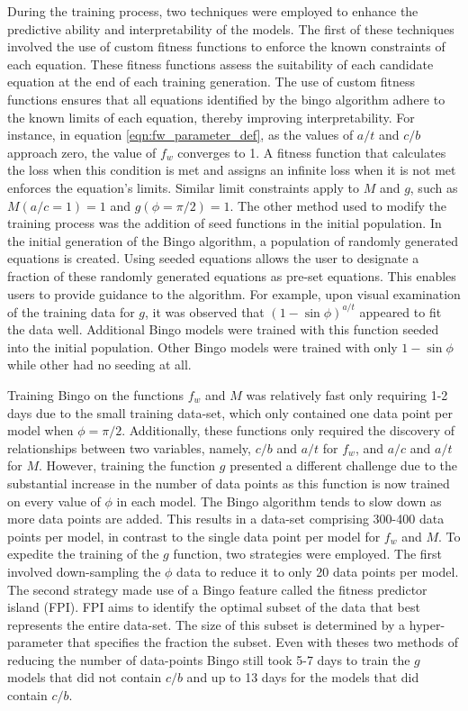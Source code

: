 During the training process, two techniques were employed to enhance the predictive ability and interpretability of the models. The first of these techniques involved the use of custom fitness functions to enforce the known constraints of each equation. These fitness functions assess the suitability of each candidate equation at the end of each training generation. The use of custom fitness functions ensures that all equations identified by the bingo algorithm adhere to the known limits of each equation, thereby improving interpretability. For instance, in equation \ref{eqn:fw_parameter_def}, as the values of $a/t$ and $c/b$ approach zero, the value of $f_w$ converges to 1. A fitness function that calculates the loss when this condition is met and assigns an infinite loss when it is not met enforces the equation's limits. Similar limit constraints apply to $M$ and $g$, such as $M(a/c = 1) = 1$ and $g(\phi = \pi/2) = 1$. The other method used to modify the training process was the addition of seed functions in the initial population. In the initial generation of the Bingo algorithm, a population of randomly generated equations is created. Using seeded equations allows the user to designate a fraction of these randomly generated equations as pre-set equations. This enables users to provide guidance to the algorithm. For example, upon visual examination of the training data for $g$, it was observed that $\left(1 - \sin\phi\right)^{a/t}$ appeared to fit the data well. Additional Bingo models were trained with this function seeded into the initial population. Other Bingo models were trained with only $1 - \sin\phi$ while other had no seeding at all. 


Training Bingo on the functions $f_w$ and $M$ was relatively fast only requiring 1-2 days due to the small training data-set, which only contained one data point per model when $\phi = \pi/2$. Additionally, these functions only required the discovery of relationships between two variables, namely, $c/b$ and $a/t$ for $f_w$, and $a/c$ and $a/t$ for $M$. However, training the function $g$ presented a different challenge due to the substantial increase in the number of data points as this function is now trained on every value of $\phi$ in each model. The Bingo algorithm tends to slow down as more data points are added. This results in a data-set comprising 300-400 data points per model, in contrast to the single data point per model for $f_w$ and $M$. To expedite the training of the $g$ function, two strategies were employed. The first involved down-sampling the $\phi$ data to reduce it to only 20 data points per model. The second strategy made use of a Bingo feature called the fitness predictor island (FPI). FPI aims to identify the optimal subset of the data that best represents the entire data-set. The size of this subset is determined by a hyper-parameter that specifies the fraction the subset. Even with theses two methods of reducing the number of data-points Bingo still took 5-7 days to train the $g$ models that did not contain $c/b$ and up to 13 days for the models that did contain $c/b$.



